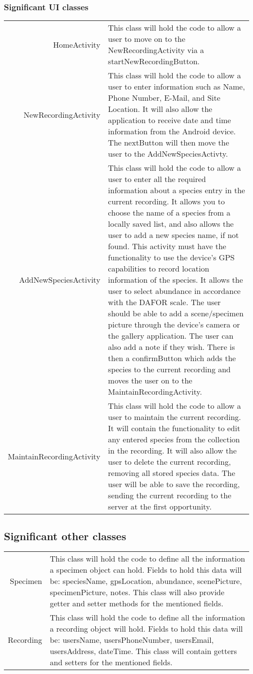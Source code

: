 	\subsubsection{Significant UI classes}
		\begin{tabular}{r p{10cm}}
		HomeActivity & This class will hold the code to allow a user to move on to the NewRecordingActivity via a startNewRecordingButton. \\

		NewRecordingActivity & This class will hold the code to allow a user to enter information such as Name, Phone Number, E-Mail, and Site Location. It will also allow the application to receive date and time information from the Android device. The nextButton will then move the user to the AddNewSpeciesActivty. \\

		AddNewSpeciesActivity & This class will hold the code to allow a user to enter all the required information about a species entry in the current recording. It allows you to choose the name of a species from a locally saved list, and also allows the user to add a new species name, if not found. This activity must have the functionality to use the device's GPS capabilities to record location information of the species. It allows the user to select abundance in accordance with the DAFOR scale. The user should be able to add a scene/specimen picture through the device's camera or the gallery application. The user can also add a note if they wish. There is then a confirmButton which adds the species to the current recording and moves the user on to the MaintainRecordingActivity. \\

		MaintainRecordingActivity & This class will hold the code to allow a user to maintain the current recording. It will contain the functionality to edit any entered species from the collection in the recording. It will also allow the user to delete the current recording, removing all stored species data. The user will be able to save the recording, sending the current recording to the server at the first opportunity. \\
		\end{tabular}

	\subsection{Significant other classes}
		\begin{tabular}{r p{13cm}}
		Specimen & This class will hold the code to define all the information a specimen object can hold. Fields to hold this data will be: speciesName, gpsLocation, abundance, scenePicture, specimenPicture, notes. This class will also provide getter and setter methods for the mentioned fields.\\

		Recording & This class will hold the code to define all the information a recording object will hold. Fields to hold this data will be: usersName, usersPhoneNumber, usersEmail, usersAddress, dateTime. This class will contain getters and setters for the mentioned fields.\\
		\end{tabular}

